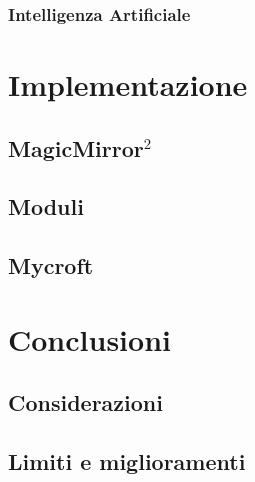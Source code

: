 \documentclass[12pt,a4paper]{article}
\begin{document}
\subsubsection{Intelligenza Artificiale}


\section{Implementazione}
\subsection{MagicMirror$^2$}
\subsection{Moduli}
\subsection{Mycroft}

\section{Conclusioni}
\subsection{Considerazioni}
\subsection{Limiti e miglioramenti}

\printbibliography
\end{document}
